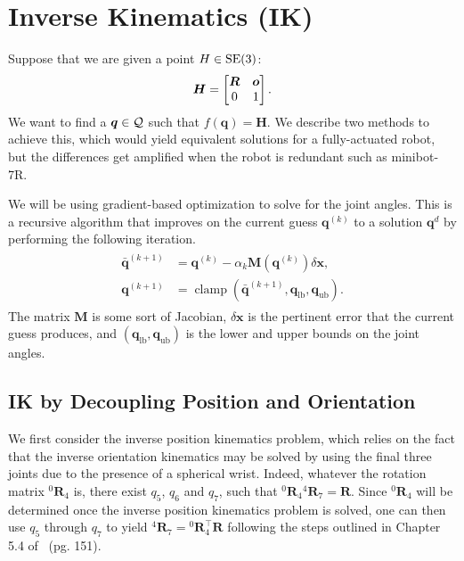 \section{Inverse Kinematics (IK)}
\label{sec:inversekin}

Suppose that we are given a point $H \in \mathrm{SE}(3)$: 
\[ \bm{H} = \begin{bmatrix}\bm{R} & \bm{o} \\ 0 & 1\end{bmatrix}. \]
We want to find a $\bm{q} \in \mathcal{Q}$ such that $f(\bm{q}) = \bm{H}$. We
describe two methods to achieve this, which would yield equivalent solutions for
a fully-actuated robot, but the differences get amplified when the robot is
redundant such as minibot-7R.

We will be using gradient-based optimization to solve for the joint angles. This
is a recursive algorithm that improves on the current guess $\bm{q}^{(k)}$ to
a solution $\bm{q}^d$ by performing the following iteration.
%
\begin{align}
  \begin{split}
  \bar{\bm{q}}^{(k+1)} &= \bm{q}^{(k)} - \alpha_k \bm{M}\left(\bm{q}^{(k)}\right)\delta \bm{x}, \\
  \bm{q}^{(k+1)} &= \operatorname{clamp}\left(\bar{\bm{q}}^{(k+1)}, \bm{q}_{\text{lb}}, \bm{q}_{\text{ub}} \right).
  \end{split}
  \label{eq:gd}
\end{align}
%
The matrix $\bm{M}$ is some sort of Jacobian, $\delta \bm{x}$ is the pertinent 
error that the current guess produces, and $(\bm{q}_{\text{lb}},
\bm{q}_{\text{ub}})$ is the lower and upper bounds on the joint angles.

\subsection{IK by Decoupling Position and Orientation}
\label{ssec:ik_decoupling}

We first consider the inverse position kinematics problem, 
which relies on the fact that the inverse orientation kinematics may be solved
by using the final three joints due to the presence of a spherical wrist.
Indeed, whatever the 
rotation matrix $^0\bm{R}_4$ is, there exist $q_5$, $q_6$ and $q_7$, such that
${}^0\bm{R}_4 {}^4\bm{R}_7 = \bm{R}$. Since ${}^0\bm{R}_4$ will be determined
once the inverse position kinematics problem is solved, one can then use $q_5$
through $q_7$ to yield ${}^4\bm{R}_7 = {}^0\bm{R}_4^\top\bm{R}$ following the 
steps outlined in Chapter 5.4 of~\cite{spong2020robot} (pg. 151).

